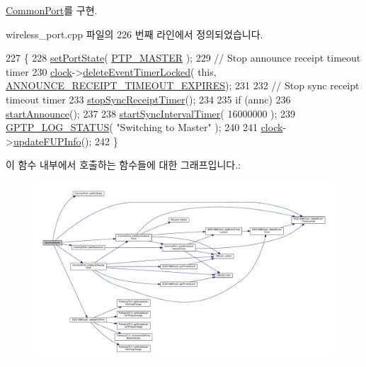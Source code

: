 \hyperlink{class_common_port_a03b0297c9770e83706826350b2815bc1}{Common\+Port}를 구현.



wireless\+\_\+port.\+cpp 파일의 226 번째 라인에서 정의되었습니다.


\begin{DoxyCode}
227 \{
228     \hyperlink{class_common_port_a8e4a7a3f199cde3540ed0d1ab10386e5}{setPortState}( \hyperlink{ptptypes_8hpp_a679431f1afc75d7bb9e972c022e53672ab4c763cac238b6403615a62111b64aa4}{PTP\_MASTER} );
229     \textcolor{comment}{// Stop announce receipt timeout timer}
230     \hyperlink{class_common_port_aa2bc8731fa5aeb5b033feebc2b67258c}{clock}->\hyperlink{class_i_e_e_e1588_clock_ab3079a65b0509eeb40c2828fa6a7834a}{deleteEventTimerLocked}( \textcolor{keyword}{this}, 
      \hyperlink{ieee1588_8hpp_a5667b805d857c6d28f83f6038a0272d3a7060ecc9be507f5c8828eedf6a163c8b}{ANNOUNCE\_RECEIPT\_TIMEOUT\_EXPIRES});
231 
232     \textcolor{comment}{// Stop sync receipt timeout timer}
233     \hyperlink{class_common_port_af3b46893f10141406c791c89d3e54b8d}{stopSyncReceiptTimer}();
234 
235     \textcolor{keywordflow}{if} (annc)
236         \hyperlink{class_common_port_a3119c85c0521ef3f23b4a2419684a015}{startAnnounce}();
237 
238     \hyperlink{class_common_port_a2033d126c19548eb5ada2d623667e1f2}{startSyncIntervalTimer}( 16000000 );
239     \hyperlink{gptp__log_8hpp_a9bcf107d6f77d335b92bbc4825ea85a3}{GPTP\_LOG\_STATUS}( \textcolor{stringliteral}{"Switching to Master"} );
240 
241     \hyperlink{class_common_port_aa2bc8731fa5aeb5b033feebc2b67258c}{clock}->\hyperlink{class_i_e_e_e1588_clock_aa41be6e57b021a11d16990ba72a69188}{updateFUPInfo}();
242 \}
\end{DoxyCode}


이 함수 내부에서 호출하는 함수들에 대한 그래프입니다.\+:
\nopagebreak
\begin{figure}[H]
\begin{center}
\leavevmode
\includegraphics[width=350pt]{class_wireless_port_af952d115c5f8260d7c0006e2236ef6e6_cgraph}
\end{center}
\end{figure}


